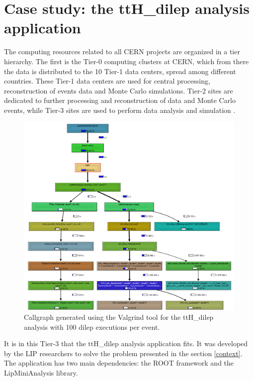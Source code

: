 
\chapter{Case study: the ttH\_dilep analysis application}
\label{app}

The computing resources related to all CERN projects are organized in a tier hierarchy. The first is the Tier-0 computing clusters at CERN, which from there the data is distributed to the 10 Tier-1 data centers, spread among different countries. These Tier-1 data centers are used for central processing, reconstruction of events data and Monte Carlo simulations. Tier-2 sites are dedicated to further processing and reconstruction of data and Monte Carlo events, while Tier-3 sites are used to perform data analysis and simulation \cite{LIP:Ibergrid}.

\begin{figure}[!htp]
	\begin{center}
		\includegraphics[scale=0.6]{../../common/img/callgraph_O3_100dilep.png}
		\caption{Callgraph generated using the Valgrind tool \cite{Callgrind} for the ttH\_dilep analysis with 100 dilep executions per event.}
		\label{fig:callgraph}
	\end{center}
\end{figure}

It is in this Tier-3 that the ttH\_dilep analysis application fits. It was developed by the LIP researchers to solve the problem presented in the section \ref{context}. The application has two main dependencies: the ROOT framework \cite{CERN:ROOT} and the LipMiniAnalysis library.

